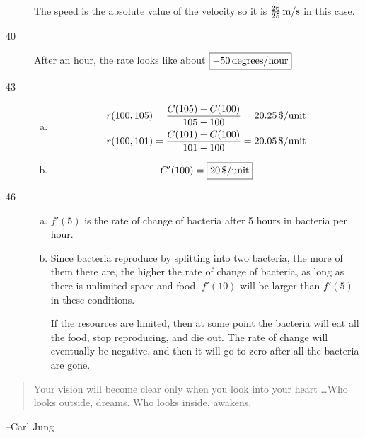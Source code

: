 \documentclass[letterpaper, landscape]{exam}
\begin{document}
\begin{description}
        The speed is the absolute value of the velocity so it is $\unit[\frac{26}{25} ]{m/s}$ in this case.
 
      \item[40]
        After an hour, the rate looks like about $\boxed{ - \unit[50]{degrees/hour} }$

      \item[43]
        \begin{enumerate}[(a)]
          \item 
            \begin{align*}
              r(100, 105) &= \frac{ C(105) - C(100) }{ 105 - 100 } = \unit[20.25]{\$/unit} \\
              r(100, 101) &= \frac{ C(101) - C(100) }{ 101 - 100 } = \unit[20.05]{\$/unit} \\
            \end{align*}

          \item
            \[
              C'(100) = \boxed{ \unit[20]{\$/unit} }
            \]
        \end{enumerate}

      \item[46]
        \begin{enumerate}[(a)]
          \item $f'(5)$ is the rate of change of bacteria after 5 hours in bacteria per hour.

          \item Since bacteria reproduce by splitting into two bacteria, the more of them
            there are, the higher the rate of change of bacteria, as long as there is
            unlimited space and food. $f'(10)$ will be larger than $f'(5)$ in these
            conditions.

            If the resources are limited, then at some point the bacteria will eat all the
            food, stop reproducing, and die out. The rate of change will eventually be
            negative, and then it will go to zero after all the bacteria are gone. 

        \end{enumerate}
     \end{description}
 
 
  \else
    \vspace{10 cm}
    \begin{quote}
      \begin{em}
        Your vision will become clear only when you look into your heart \dots Who looks
        outside, dreams. Who looks inside, awakens.
      \end{em}
    \end{quote}
    \hspace{2 cm} --Carl Jung
  \fi
\end{document}

